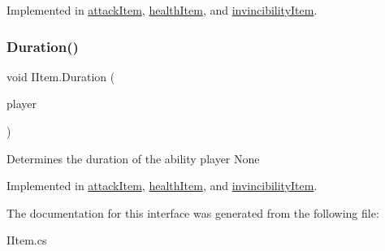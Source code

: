 Implemented in \mbox{\hyperlink{classattack_item_ab5739e198a4a255f81d371df77bb770b}{attack\+Item}}, \mbox{\hyperlink{classhealth_item_a86f0e7f02919e7daa4076717a3a0acac}{health\+Item}}, and \mbox{\hyperlink{classinvincibility_item_a6fe1d452c0e956c50b4cb468b4bd140b}{invincibility\+Item}}.

\mbox{\label{interface_i_item_a797c1d62a7828bf428cc486ceaf18e9c}} 
\subsubsection{\texorpdfstring{Duration()}{Duration()}}
{\footnotesize\ttfamily void I\+Item.\+Duration (\begin{DoxyParamCaption}\item[{\mbox{\hyperlink{class_i_player}{I\+Player}}}]{player }\end{DoxyParamCaption})}

Determines the duration of the ability  player  None 

Implemented in \mbox{\hyperlink{classattack_item_a5cf5ac415471d294a3244988466d54ac}{attack\+Item}}, \mbox{\hyperlink{classhealth_item_a545574879140f4c98b388f1dc7d2a7f8}{health\+Item}}, and \mbox{\hyperlink{classinvincibility_item_abe2368f3358065d15547f24e8cee2de5}{invincibility\+Item}}.



The documentation for this interface was generated from the following file\+:\begin{DoxyCompactItemize}
\item 
I\+Item.\+cs\end{DoxyCompactItemize}
